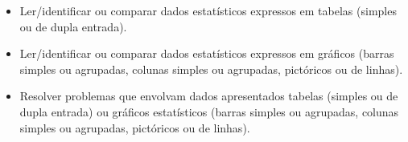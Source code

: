 \begin{multicols}{2}
{\begin{escolha}

\begin{itemize}
    \item Ler/identificar ou comparar dados estatísticos expressos em tabelas
(simples ou de dupla entrada).

    \item Ler/identificar ou comparar dados estatísticos expressos em gráficos
(barras simples ou agrupadas, colunas simples ou agrupadas, pictóricos
ou de linhas).

    \item Resolver problemas que envolvam dados apresentados tabelas (simples ou
de dupla entrada) ou gráficos estatísticos (barras simples ou agrupadas,
colunas simples ou agrupadas, pictóricos ou de linhas).
\end{itemize}


\end{escolha}}
\end{multicols}
